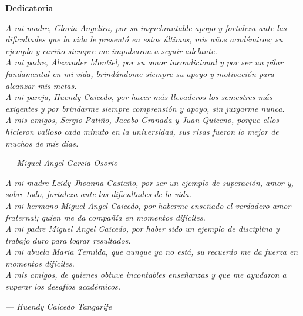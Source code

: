 \cleardoublepage%
%
\thispagestyle{empty}


\begin{center}
	{\Large\bfseries Dedicatoria}
\end{center}


\begin{center}
	\textit{
		A mi madre, Gloria Angelica, por su inquebrantable apoyo y fortaleza ante las dificultades que la vida le presentó en estos últimos, mis años académicos; su ejemplo y cariño siempre me impulsaron a seguir adelante.\\
		A mi padre, Alexander Montiel, por su amor incondicional y por ser un pilar fundamental en mi vida, brindándome siempre su apoyo y motivación para alcanzar mis metas.\\
		A mi pareja, Huendy Caicedo, por hacer más llevaderos los semestres más exigentes y por brindarme siempre comprensión y apoyo, sin juzgarme nunca.\\
		A mis amigos, Sergio Patiño, Jacobo Granada y Juan Quiceno, porque ellos hicieron valioso cada minuto en la universidad, sus risas fueron lo mejor de muchos de mis días.
	}
	\vspace{1cm}

	\hfill \textit{--- Miguel Angel Garcia Osorio}

	\vspace{2cm}

	\textit{
		A mi madre Leidy Jhoanna Castaño, por ser un ejemplo de superación, amor y, sobre todo, fortaleza ante las dificultades de la vida.
		\\
		A mi hermano Miguel Angel Caicedo, por haberme enseñado el verdadero amor fraternal; quien me da compañía en momentos difíciles.
		\\
		A mi padre Miguel Angel Caicedo, por haber sido un ejemplo de disciplina y trabajo duro para lograr resultados.
		\\
		A mi abuela Maria Temilda, que aunque ya no está, su recuerdo me da fuerza en momentos difíciles.
		\\
		A mis amigos, de quienes obtuve incontables enseñanzas y que me ayudaron a superar los desafíos académicos.
	}

	\vspace{1cm}

	\hfill \textit{--- Huendy Caicedo Tangarife}
\end{center}
